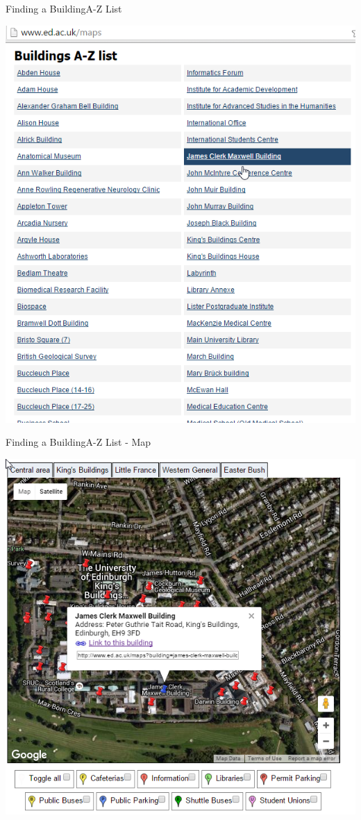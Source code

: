 \documentclass{beamer}
\begin{document}
\begin{frame}{Finding a Building}{A-Z List}
  \centerline{\includegraphics[height=0.8\textheight]{atozlist.png}}
\end{frame}

\begin{frame}{Finding a Building}{A-Z List - Map}
  \centerline{\includegraphics[height=0.8\textheight]{atozmap.png}}
\end{frame}
\end{document}
